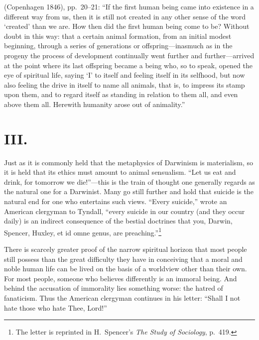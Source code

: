 \documentclass[12pt,a4paper]{article}
\begin{document}
\noindent (Copenhagen 1846), pp.\ 20--21: ``If the first human being
came into existence in a different way from us, then it is still not
created in any other sense of the word `created' than we are. How
then did the first human being come to be? Without doubt in this way:
that a certain animal formation, from an initial modest beginning,
through a series of generations or offspring---inasmuch as in the
progeny the process of development continually went further and
further---arrived at the point where its last offspring became a being
who, so to speak, opened the eye of spiritual life, saying `I' to
itself and feeling itself in its selfhood, but now also feeling the
drive in itself to name all animals, that is, to impress its stamp
upon them, and to regard itself as standing in relation to them all,
and even above them all. Herewith humanity arose out of animality.''

\section*{III.}

Just as it is commonly held that the metaphysics of Darwinism is
materialism, so it is held that its ethics must amount to animal
sensualism. ``Let us eat and drink, for tomorrow we die!''---this is
the train of thought one generally regards as the natural one for a
Darwinist. Many go still further and hold that suicide is the natural
end for one who entertains such views. ``Every suicide,'' wrote an
American clergyman to Tyndall, ``every suicide in our country (and
they occur daily) is an indirect consequence of the bestial doctrines
that you, Darwin, Spencer, Huxley, et id omne genus, are
preaching.''\footnote{The letter is reprinted in H.\ Spencer's
\textit{The Study of Sociology}, p.\ 419.}

There is scarcely greater proof of the narrow spiritual horizon that
most people still possess than the great difficulty they have in
conceiving that a moral and noble human life can be lived on the basis
of a worldview other than their own. For most people, someone who
believes differently is an immoral being. And behind the accusation
of immorality lies something worse: the hatred of fanaticism. Thus the
American clergyman continues in his letter: ``Shall I not hate those
who hate Thee, Lord!''
\end{document}
